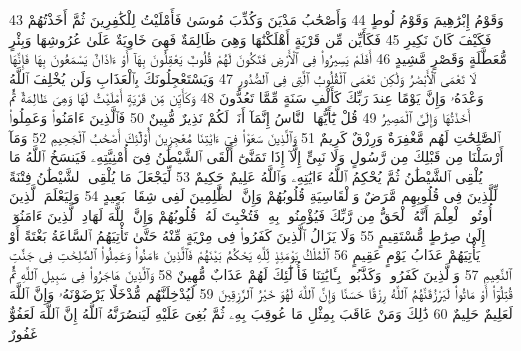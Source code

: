 {\tiny\colorbox{cl_aya}{43}} وَقَوْمُ إِبْرَٰهِيمَ وَقَوْمُ لُوطٍ
{\tiny\colorbox{cl_aya}{44}} وَأَصْحَٰبُ مَدْيَنَ وَكُذِّبَ مُوسَىٰ فَأَمْلَيْتُ لِلْكَٰفِرِينَ ثُمَّ أَخَذْتُهُمْ فَكَيْفَ كَانَ نَكِيرِ
{\tiny\colorbox{cl_aya}{45}} فَكَأَيِّن مِّن قَرْيَةٍ أَهْلَكْنَٰهَا وَهِىَ ظَالِمَةٌ فَهِىَ خَاوِيَةٌ عَلَىٰ عُرُوشِهَا وَبِئْرٍ مُّعَطَّلَةٍ وَقَصْرٍ مَّشِيدٍ
{\tiny\colorbox{cl_aya}{46}} أَفَلَمْ يَسِيرُوا۟ فِى ٱلْأَرْضِ فَتَكُونَ لَهُمْ قُلُوبٌ يَعْقِلُونَ بِهَآ أَوْ ءَاذَانٌ يَسْمَعُونَ بِهَا فَإِنَّهَا لَا تَعْمَى ٱلْأَبْصَٰرُ وَلَٰكِن تَعْمَى ٱلْقُلُوبُ ٱلَّتِى فِى ٱلصُّدُورِ
{\tiny\colorbox{cl_aya}{47}} وَيَسْتَعْجِلُونَكَ بِٱلْعَذَابِ وَلَن يُخْلِفَ ٱللَّهُ وَعْدَهُۥ وَإِنَّ يَوْمًا عِندَ رَبِّكَ كَأَلْفِ سَنَةٍ مِّمَّا تَعُدُّونَ
{\tiny\colorbox{cl_aya}{48}} وَكَأَيِّن مِّن قَرْيَةٍ أَمْلَيْتُ لَهَا وَهِىَ ظَالِمَةٌ ثُمَّ أَخَذْتُهَا وَإِلَىَّ ٱلْمَصِيرُ
{\tiny\colorbox{cl_aya}{49}} قُلْ يَٰٓأَيُّهَا ٱلنَّاسُ إِنَّمَآ أَنَا۠ لَكُمْ نَذِيرٌ مُّبِينٌ
{\tiny\colorbox{cl_aya}{50}} فَٱلَّذِينَ ءَامَنُوا۟ وَعَمِلُوا۟ ٱلصَّٰلِحَٰتِ لَهُم مَّغْفِرَةٌ وَرِزْقٌ كَرِيمٌ
{\tiny\colorbox{cl_aya}{51}} وَٱلَّذِينَ سَعَوْا۟ فِىٓ ءَايَٰتِنَا مُعَٰجِزِينَ أُو۟لَٰٓئِكَ أَصْحَٰبُ ٱلْجَحِيمِ
{\tiny\colorbox{cl_aya}{52}} وَمَآ أَرْسَلْنَا مِن قَبْلِكَ مِن رَّسُولٍ وَلَا نَبِىٍّ إِلَّآ إِذَا تَمَنَّىٰٓ أَلْقَى ٱلشَّيْطَٰنُ فِىٓ أُمْنِيَّتِهِۦ فَيَنسَخُ ٱللَّهُ مَا يُلْقِى ٱلشَّيْطَٰنُ ثُمَّ يُحْكِمُ ٱللَّهُ ءَايَٰتِهِۦ وَٱللَّهُ عَلِيمٌ حَكِيمٌ
{\tiny\colorbox{cl_aya}{53}} لِّيَجْعَلَ مَا يُلْقِى ٱلشَّيْطَٰنُ فِتْنَةً لِّلَّذِينَ فِى قُلُوبِهِم مَّرَضٌ وَٱلْقَاسِيَةِ قُلُوبُهُمْ وَإِنَّ ٱلظَّٰلِمِينَ لَفِى شِقَاقٍۭ بَعِيدٍ
{\tiny\colorbox{cl_aya}{54}} وَلِيَعْلَمَ ٱلَّذِينَ أُوتُوا۟ ٱلْعِلْمَ أَنَّهُ ٱلْحَقُّ مِن رَّبِّكَ فَيُؤْمِنُوا۟ بِهِۦ فَتُخْبِتَ لَهُۥ قُلُوبُهُمْ وَإِنَّ ٱللَّهَ لَهَادِ ٱلَّذِينَ ءَامَنُوٓا۟ إِلَىٰ صِرَٰطٍ مُّسْتَقِيمٍ
{\tiny\colorbox{cl_aya}{55}} وَلَا يَزَالُ ٱلَّذِينَ كَفَرُوا۟ فِى مِرْيَةٍ مِّنْهُ حَتَّىٰ تَأْتِيَهُمُ ٱلسَّاعَةُ بَغْتَةً أَوْ يَأْتِيَهُمْ عَذَابُ يَوْمٍ عَقِيمٍ
{\tiny\colorbox{cl_aya}{56}} ٱلْمُلْكُ يَوْمَئِذٍ لِّلَّهِ يَحْكُمُ بَيْنَهُمْ فَٱلَّذِينَ ءَامَنُوا۟ وَعَمِلُوا۟ ٱلصَّٰلِحَٰتِ فِى جَنَّٰتِ ٱلنَّعِيمِ
{\tiny\colorbox{cl_aya}{57}} وَٱلَّذِينَ كَفَرُوا۟ وَكَذَّبُوا۟ بِـَٔايَٰتِنَا فَأُو۟لَٰٓئِكَ لَهُمْ عَذَابٌ مُّهِينٌ
{\tiny\colorbox{cl_aya}{58}} وَٱلَّذِينَ هَاجَرُوا۟ فِى سَبِيلِ ٱللَّهِ ثُمَّ قُتِلُوٓا۟ أَوْ مَاتُوا۟ لَيَرْزُقَنَّهُمُ ٱللَّهُ رِزْقًا حَسَنًا وَإِنَّ ٱللَّهَ لَهُوَ خَيْرُ ٱلرَّٰزِقِينَ
{\tiny\colorbox{cl_aya}{59}} لَيُدْخِلَنَّهُم مُّدْخَلًا يَرْضَوْنَهُۥ وَإِنَّ ٱللَّهَ لَعَلِيمٌ حَلِيمٌ
{\tiny\colorbox{cl_aya}{60}} ذَٰلِكَ وَمَنْ عَاقَبَ بِمِثْلِ مَا عُوقِبَ بِهِۦ ثُمَّ بُغِىَ عَلَيْهِ لَيَنصُرَنَّهُ ٱللَّهُ إِنَّ ٱللَّهَ لَعَفُوٌّ غَفُورٌ
